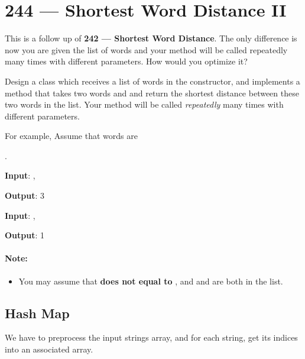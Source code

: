 \section{244 --- Shortest Word Distance II}
This is a follow up of \textbf{242 --- Shortest Word Distance}. The only difference is now you are given the list of words and your method will be called repeatedly many times with different parameters. How would you optimize it?

Design a class which receives a list of words in the constructor, and implements a method that takes two words  and  and return the shortest distance between these two words in the list. Your method will be called \textit{repeatedly} many times with different parameters. 

For example, Assume that words are 

.

\begin{flushleft}

\textbf{Input}: , 

\textbf{Output}: 3

\textbf{Input}: , 

\textbf{Output}: 1
\end{flushleft}

\paragraph{Note:}
\begin{itemize}
\item You may assume that  \textbf{does not equal to} , and  and  are both in the list.
\end{itemize}

\subsection{Hash Map}
We have to preprocess the input strings array, and for each string, get its indices into an associated array.
